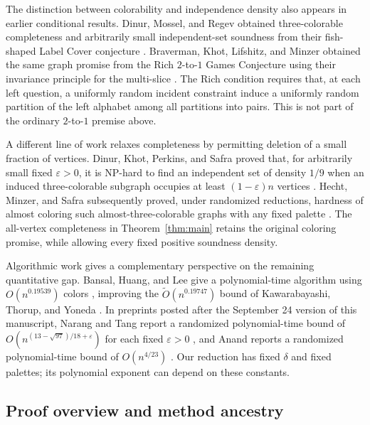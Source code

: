 The distinction between colorability and independence density also
appears in earlier conditional results. Dinur, Mossel, and Regev obtained
three-colorable completeness and arbitrarily small independent-set
soundness from their fish-shaped Label Cover conjecture
\cite[Conjecture~4.8 and Sections~4.3--4.5]{DinurMosselRegev2009}.
Braverman, Khot, Lifshitz, and Minzer obtained the same graph promise
from the Rich $2$-to-$1$ Games Conjecture using their invariance principle
for the multi-slice \cite[Corollary~1.19]{BravermanKhotLifshitzMinzer2022}.
The Rich condition requires that, at each left question, a uniformly
random incident constraint induce a uniformly random partition of the
left alphabet among all partitions into pairs. This is not part of the
ordinary $2$-to-$1$ premise above.

A different line of work relaxes completeness by permitting deletion
of a small fraction of vertices. Dinur, Khot, Perkins, and Safra proved
that, for arbitrarily small fixed $\varepsilon>0$, it is NP-hard to find
an independent set of density $1/9$ when an induced
three-colorable subgraph occupies at least $(1-\varepsilon)n$ vertices
\cite{DinurKhotPerkinsSafra2010}.
Hecht, Minzer, and Safra subsequently proved, under randomized reductions,
hardness of almost coloring such almost-three-colorable graphs with any
fixed palette \cite{HechtMinzerSafra2023}.
The all-vertex completeness in Theorem~\ref{thm:main} retains the original
coloring promise, while allowing every fixed positive soundness density.

Algorithmic work gives a complementary perspective on the remaining
quantitative gap. Bansal, Huang, and Lee give a polynomial-time algorithm
using $O(n^{0.19539})$ colors \cite{BansalHuangLee2026}, improving the
$\widetilde O(n^{0.19747})$ bound of Kawarabayashi, Thorup, and Yoneda
\cite{KawarabayashiThorupYoneda2024}.
In preprints posted after the September 24 version of this manuscript,
Narang and Tang report a randomized polynomial-time bound of
$O(n^{(13-\sqrt{97})/18+\varepsilon})$ for each fixed
$\varepsilon>0$ \cite{NarangTang2026}, and Anand reports a randomized
polynomial-time bound of $O(n^{4/23})$ \cite{Anand2026}.
Our reduction has fixed $\delta$ and fixed palettes; its polynomial
exponent can depend on these constants.

\subsection{Proof overview and method ancestry}

